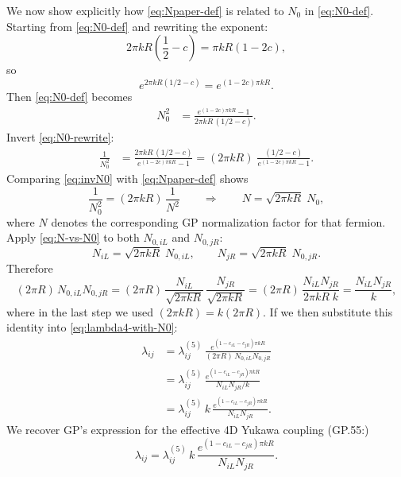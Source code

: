 \documentclass[11pt]{article}
\begin{document}
We now show explicitly how \eqref{eq:Npaper-def} is related to $N_0$ in \eqref{eq:N0-def}. Starting from \eqref{eq:N0-def} and rewriting the exponent:
\[
2\pi kR\left(\frac12-c\right)=\pi kR(1-2c),
\]
so
\[
e^{2\pi kR(1/2-c)} = e^{(1-2c)\pi kR}.
\]
Then \eqref{eq:N0-def} becomes
\begin{align}
N_0^2
&=
\frac{e^{(1-2c)\pi kR}-1}{2\pi kR\,(1/2-c)}.
\label{eq:N0-rewrite}
\end{align}
Invert \eqref{eq:N0-rewrite}:
\begin{align}
\frac{1}{N_0^2}
&=
\frac{2\pi kR\,(1/2-c)}{e^{(1-2c)\pi kR}-1}
=
(2\pi kR)\;
\frac{(1/2-c)}{e^{(1-2c)\pi kR}-1}.
\label{eq:invN0}
\end{align}
Comparing \eqref{eq:invN0} with \eqref{eq:Npaper-def} shows
\begin{equation}
\frac{1}{N_0^2} = (2\pi kR)\,\frac{1}{N^2}
\qquad\Longrightarrow\qquad
N = \sqrt{2\pi kR}\;N_0,
\label{eq:N-vs-N0}
\end{equation}
where $N$ denotes the corresponding GP normalization factor for that fermion. Apply \eqref{eq:N-vs-N0} to both $N_{0,iL}$ and $N_{0,jR}$:
\begin{equation}
N_{iL}=\sqrt{2\pi kR}\;N_{0,iL},
\qquad
N_{jR}=\sqrt{2\pi kR}\;N_{0,jR}.
\label{eq:Nij-vs-N0ij}
\end{equation}
Therefore
\[
(2\pi R)\,N_{0,iL}N_{0,jR}
=
(2\pi R)\,
\frac{N_{iL}}{\sqrt{2\pi kR}}\,
\frac{N_{jR}}{\sqrt{2\pi kR}}
=
(2\pi R)\,
\frac{N_{iL}N_{jR}}{2\pi kR\;k}
=
\frac{N_{iL}N_{jR}}{k},
\]
where in the last step we used $(2\pi kR)=k(2\pi R)$. If we then substitute this identity into \eqref{eq:lambda4-with-N0}:
\begin{align}
\lambda_{ij}
&=
\lambda^{(5)}_{ij}\,
\frac{e^{(1-c_{iL}-c_{jR})\pi kR}}{(2\pi R)\,N_{0,iL}N_{0,jR}}
\nonumber\\[6pt]
&=
\lambda^{(5)}_{ij}\,
\frac{e^{(1-c_{iL}-c_{jR})\pi kR}}{N_{iL}N_{jR}/k}
\nonumber\\[6pt]
&=
\lambda^{(5)}_{ij}\,k\,
\frac{e^{(1-c_{iL}-c_{jR})\pi kR}}{N_{iL}N_{jR}}.
\label{eq:lambda4-final}
\end{align}
We recover GP's expression for the effective 4D Yukawa coupling (GP.55:)
\begin{equation}
\lambda_{ij}
=
\lambda^{(5)}_{ij}\,k\,
\frac{e^{(1-c_{iL}-c_{jR})\pi kR}}{N_{iL}N_{jR}}.
\label{eq:lambda4-boxed}
\end{equation}
\end{document}
